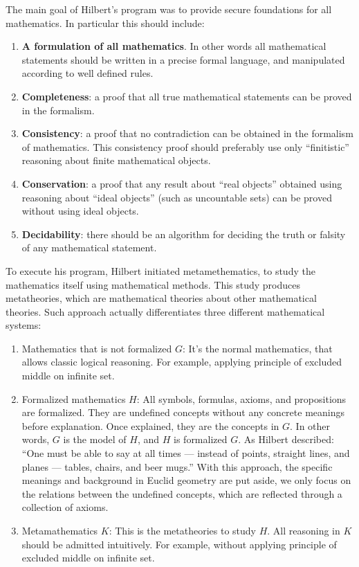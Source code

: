 \documentclass{article}
\begin{document}
The main goal of Hilbert's program was to provide secure foundations for all mathematics. In particular this should include:

\begin{enumerate}
\item \textbf{A formulation of all mathematics}. In other words all mathematical statements should be written in a precise formal language, and manipulated according to well defined rules.

\item \textbf{Completeness}: a proof that all true mathematical statements can be proved in the formalism.
\item \textbf{Consistency}: a proof that no contradiction can be obtained in the formalism of mathematics. This consistency proof should preferably use only ``finitistic'' reasoning about finite mathematical objects.
\item \textbf{Conservation}: a proof that any result about ``real objects'' obtained using reasoning about ``ideal objects'' (such as uncountable sets) can be proved without using ideal objects.
\item \textbf{Decidability}: there should be an algorithm for deciding the truth or falsity of any mathematical statement.
\end{enumerate}

To execute his program, Hilbert initiated metamethematics, to study the mathematics itself using mathematical methods. This study produces metatheories, which are mathematical theories about other mathematical theories. Such approach actually differentiates three different mathematical systems:

\begin{enumerate}
\item Mathematics that is not formalized $G$: It's the normal mathematics, that allows classic logical reasoning. For example, applying principle of excluded middle on infinite set.

\item Formalized mathematics $H$: All symbols, formulas, axioms, and propositions are formalized. They are undefined concepts without any concrete meanings before explanation. Once explained, they are the concepts in $G$. In other words, $G$ is the model of $H$, and $H$ is formalized $G$. As Hilbert described: ``One must be able to say at all times — instead of points, straight lines, and planes — tables, chairs, and beer mugs.'' With this approach, the specific meanings and background in Euclid geometry are put aside, we only focus on the relations between the undefined concepts, which are reflected through a collection of axioms.

\item Metamathematics $K$: This is the metatheories to study $H$. All reasoning in $K$ should be admitted intuitively. For example, without applying principle of excluded middle on infinite set.
\end{enumerate}
\end{document}
